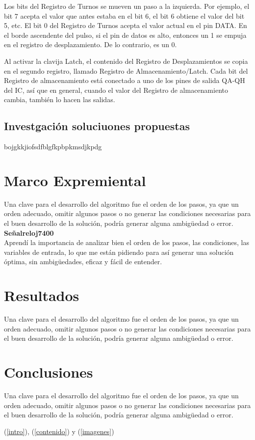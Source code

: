 \documentclass{article}
\begin{document}
Los bits del Registro de Turnos se mueven un paso a la izquierda. Por ejemplo, el bit 7 acepta el valor que antes estaba en el bit 6, el bit 6 obtiene el valor del bit 5, etc.
El bit 0 del Registro de Turnos acepta el valor actual en el pin DATA. En el borde ascendente del pulso, si el pin de datos es alto, entonces un 1 se empuja en el registro de desplazamiento. De lo contrario, es un 0.

Al activar la clavija Latch, el contenido del Registro de Desplazamientos se copia en el segundo registro, llamado Registro de Almacenamiento/Latch. Cada bit del Registro de almacenamiento está conectado a uno de los pines de salida QA-QH del IC, así que en general, cuando el valor del Registro de almacenamiento cambia, también lo hacen las salidas.

\subsection{Investgación soluciuones propuestas}
bojgkkjiofsdfblgfkpbpkmsdjkpdg


\section{Marco Expremiental} \label{practica}
Una clave para el desarrollo del algoritmo fue el orden de los pasos, ya que un orden adecuado, omitir algunos pasos o no generar las condiciones necesarias para el buen desarrollo de la solución, podría generar alguna ambigüedad o error. \textbf{Señalreloj7400} \cite{Señalreloj7400}
\\[0.2cm]
Aprendí la importancia de analizar bien el orden de los pasos, las condiciones, las variables de entrada, lo que me están pidiendo para así generar una solución óptima, sin ambigüedades, eficaz y fácil de entender.


\section{Resultados} \label{conclusiones}
Una clave para el desarrollo del algoritmo fue el orden de los pasos, ya que un orden adecuado, omitir algunos pasos o no generar las condiciones necesarias para el buen desarrollo de la solución, podría generar alguna ambigüedad o error.

\section{Conclusiones} \label{conclusiones}
Una clave para el desarrollo del algoritmo fue el orden de los pasos, ya que un orden adecuado, omitir algunos pasos o no generar las condiciones necesarias para el buen desarrollo de la solución, podría generar alguna ambigüedad o error.



(\ref{intro}), (\ref{contenido}) y (\ref{imagenes})


\end{document}
